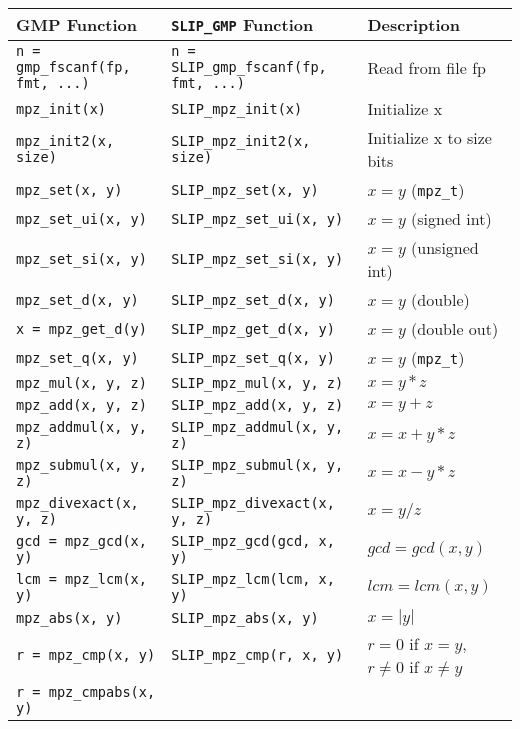 \documentclass[12pt]{article}
\theoremstyle{definition}
\begin{document}
{\begin{center}
\begin{tabular}{|l|l|l|}
{\bf GMP Function} & \verb|SLIP_GMP| {\bf Function} & {\bf Description} \\
\hline\hline
\verb|n = gmp_fscanf(fp, fmt, ...)|
    & \verb|n = SLIP_gmp_fscanf(fp, fmt, ...)|
    & Read from file fp \\ \hline
\verb|mpz_init(x)|
    & \verb|SLIP_mpz_init(x)|
    & Initialize x \\ \hline
\verb|mpz_init2(x, size)|
    & \verb|SLIP_mpz_init2(x, size)|
    & Initialize x to size bits \\ \hline
\verb|mpz_set(x, y)|
    & \verb|SLIP_mpz_set(x, y)| 
    & $x = y$ (\verb|mpz_t|) \\ \hline
\verb|mpz_set_ui(x, y)|
    & \verb|SLIP_mpz_set_ui(x, y)|
    & $x = y$ (signed int) \\ \hline
\verb|mpz_set_si(x, y)|
    & \verb|SLIP_mpz_set_si(x, y)|
    & $x = y$ (unsigned int) \\ \hline
\verb|mpz_set_d(x, y)|
    & \verb|SLIP_mpz_set_d(x, y)|
    & $x = y$ (double)\\ \hline
\verb|x = mpz_get_d(y)|
    & \verb|SLIP_mpz_get_d(x, y)|
    & $x = y$ (double out) \\ \hline
\verb|mpz_set_q(x, y)|
    & \verb|SLIP_mpz_set_q(x, y)|
    & $x = y$ (\verb|mpz_t|) \\ \hline
\verb|mpz_mul(x, y, z)|
    & \verb|SLIP_mpz_mul(x, y, z)|
    & $x = y*z$ \\ \hline
\verb|mpz_add(x, y, z)|
    & \verb|SLIP_mpz_add(x, y, z)|
    & $x = y+z$ \\ \hline
\verb|mpz_addmul(x, y, z)|
    & \verb|SLIP_mpz_addmul(x, y, z)|
    & $x = x+y*z$ \\ \hline
\verb|mpz_submul(x, y, z)|
    & \verb|SLIP_mpz_submul(x, y, z)|
    & $x = x-y*z$ \\ \hline
\verb|mpz_divexact(x, y, z)|
    & \verb|SLIP_mpz_divexact(x, y, z)|
    & $x = y/z$ \\ \hline
\verb|gcd = mpz_gcd(x, y)|
    & \verb|SLIP_mpz_gcd(gcd, x, y)|
    & $gcd = gcd(x,y)$\\ \hline
\verb|lcm = mpz_lcm(x, y)|
    & \verb|SLIP_mpz_lcm(lcm, x, y)|
    & $lcm = lcm(x,y)$ \\ \hline
\verb|mpz_abs(x, y)|
    & \verb|SLIP_mpz_abs(x, y)|
    & $x = |y|$ \\ \hline
\verb|r = mpz_cmp(x, y)|
    & \verb|SLIP_mpz_cmp(r, x, y)|
    & $r = 0$ if $x=y$, $r\neq 0$  if $x\neq y$ \\ \hline
\verb|r = mpz_cmpabs(x, y)|

\end{tabular}
\end{center}}
\end{document}
